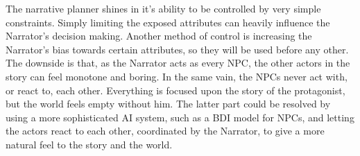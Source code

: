 The narrative planner shines in it's ability to be controlled by very simple constraints.
Simply limiting the exposed attributes can heavily influence the Narrator's decision making.
Another method of control is increasing the Narrator's bias towards certain attributes, so they will be used before any other.
The downside is that, as the Narrator acts as every NPC, the other actors in the story can feel monotone and boring.
In the same vain, the NPCs never act with, or react to, each other.
Everything is focused upon the story of the protagonist, but the world feels empty without him.
The latter part could be resolved by using a more sophisticated AI system, such as a BDI model for NPCs, and letting the actors react to each other, coordinated by the Narrator, to give a more natural feel to the story and the world.
